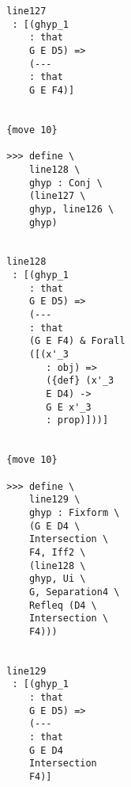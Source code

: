 \documentclass[12pt]{article}
\begin{document}
\begin{verbatim}
                                 line127 
                                  : [(ghyp_1 
                                     : that 
                                     G E D5) => 
                                     (--- 
                                     : that 
                                     G E F4)]


                                 {move 10}

                                 >>> define \
                                     line128 \
                                     ghyp : Conj \
                                     (line127 \
                                     ghyp, line126 \
                                     ghyp)


                                 line128 
                                  : [(ghyp_1 
                                     : that 
                                     G E D5) => 
                                     (--- 
                                     : that 
                                     (G E F4) & Forall 
                                     ([(x'_3 
                                        : obj) => 
                                        ({def} (x'_3 
                                        E D4) -> 
                                        G E x'_3 
                                        : prop)]))]


                                 {move 10}

                                 >>> define \
                                     line129 \
                                     ghyp : Fixform \
                                     (G E D4 \
                                     Intersection \
                                     F4, Iff2 \
                                     (line128 \
                                     ghyp, Ui \
                                     G, Separation4 \
                                     Refleq (D4 \
                                     Intersection \
                                     F4)))


                                 line129 
                                  : [(ghyp_1 
                                     : that 
                                     G E D5) => 
                                     (--- 
                                     : that 
                                     G E D4 
                                     Intersection 
                                     F4)]



\end{verbatim}
\end{document}

